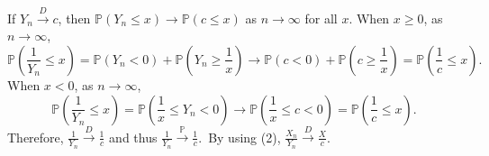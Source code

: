 \documentclass{huhtakm-template-book-v2}
\newcommand{\prob}{\mathbb{P}}
\begin{document}
\begin{proofing}
\begin{enumerate}
            If $Y_{n} \xrightarrow{D} c$, then $\prob(Y_{n} \leq x) \to \prob(c \leq x)$ as $n \to \infty$ for all $x$. When $x \geq 0$, as $n \to \infty$,
            \begin{equation*}
                \prob\left(\frac{1}{Y_{n}} \leq x\right) = \prob(Y_{n} < 0)+\prob\left(Y_{n} \geq \frac{1}{x}\right) \to \prob(c < 0)+\prob\left(c \geq \frac{1}{x}\right) = \prob\left(\frac{1}{c} \leq x\right).
            \end{equation*}
            When $x < 0$, as $n \to \infty$,
            \begin{equation*}
                \prob\left(\frac{1}{Y_{n}} \leq x\right) = \prob\left(\frac{1}{x} \leq Y_{n} < 0\right) \to \prob\left(\frac{1}{x} \leq c < 0\right) = \prob\left(\frac{1}{c} \leq x\right).
            \end{equation*}
            Therefore, $\frac{1}{Y_{n}} \xrightarrow{D} \frac{1}{c}$ and thus $\frac{1}{Y_{n}} \xrightarrow{\prob} \frac{1}{c}$.\
            By using (2), $\frac{X_{n}}{Y_{n}} \xrightarrow{D} \frac{X}{c}$.
        \end{enumerate}
    \end{proofing}
    \newpage
\end{document}
